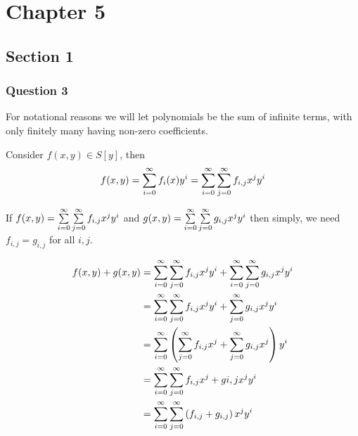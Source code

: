 \documentclass{article}
\begin{document}
\section{Chapter 5}
\subsection{Section 1}
\subsubsection{Question 3}
For notational reasons we will let polynomials be the sum of infinite terms, with only finitely many having non-zero coefficients.

 Consider $f(x,y) \in S[y]$, then $$f(x,y) =\sum\limits_{i=0}^{\infty}  {f_i(x)y^i}  = \sum\limits_{i=0}^{\infty}  {\sum\limits_{j=0}^{\infty}  {f_{i,j}x^j}  y^i} $$

 If $f(x,y) = \sum\limits_{i=0}^{\infty}  {\sum\limits_{j=0}^{\infty}  {f_{i,j}x^j}  y^i} $ and $g(x,y) = \sum\limits_{i=0}^{\infty}  {\sum\limits_{j=0}^{\infty}  {g_{i,j}x^j}  y^i} $ then simply, we need $f_{i,j}=g_{i,j}$ for all $i,j$.

\begin{align*}f(x,y) + g(x,y) &= \sum\limits_{i=0}^{\infty}  {\sum\limits_{j=0}^{\infty}  {f_{i,j}x^j}  y^i}  + \sum\limits_{i=0}^{\infty}  {\sum\limits_{j=0}^{\infty}  {g_{i,j}x^j}  y^i} \\
&=\sum\limits_{i=0}^{\infty}  {\sum\limits_{j=0}^{\infty}  {f_{i,j}x^j}  y^i+\sum\limits_{j=0}^{\infty}  {g_{i,j}x^j}  y^i} \\
&= \sum\limits_{i=0}^{\infty}  {\left(\sum\limits_{j=0}^{\infty}  {f_{i,j}x^j} +\sum\limits_{j=0}^{\infty}  {g_{i,j}x^j} \right)y^i} \\
&= \sum\limits_{i=0}^{\infty}  {\sum\limits_{j=0}^{\infty}  {f_{i,j}x^j+g{i,j}x^j}  y^i} \\
&= \sum\limits_{i=0}^{\infty}  {\sum\limits_{j=0}^{\infty}  {\left(f_{i,j}+g_{i,j}\right)x^j}  y^i} 
\end{align*}
\end{document}
